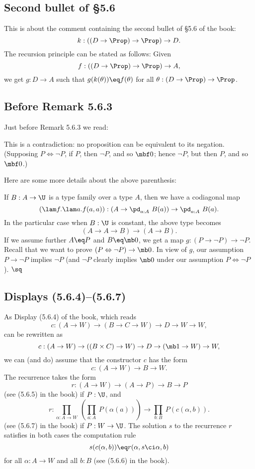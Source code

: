 \documentclass[12pt]{article}
\begin{document}

\subsection{Second bullet of \S5.6}%

This is about the comment containing the second bullet of \S5.6 of the book:
$$
k:((D\to\Prop)\to\Prop)\to D.
$$ 
The recursion principle can be stated as follows: Given 
$$
f:((D\to\Prop)\to\Prop)\to A,
$$ 
we get $g:D\to A$ such that $g(k(\theta))\eq f(\theta)$ for all $\theta:(D\to\Prop)\to\Prop$.


\subsection{Before Remark 5.6.3}%

Just before Remark 5.6.3 we read:

\nn\guillemotleft This is a contradiction: no proposition can be equivalent to its negation. (Supposing $P\Leftrightarrow\neg P$, if $P$, then $\neg P$, and so $\mbf0$; hence $\neg P$, but then $P$, and so $\mbf0$.)\guillemotright

Here are some more details about the above parenthesis:

If $B:A\to\U$ is a type family over a type $A$, then we have a codiagonal map 
\begin{equation}\label{563}
(\lam f.\lam a.f(a,a)):\left(A\to\pd_{a:A}\ B(a)\right)\to\pd_{a:A}\ B(a).
\end{equation} 
In the particular case when $B:\U$ is constant, the above type becomes 
$$
(A\to A\to B)\to(A\to B).
$$ 
If we assume further $A\eq P$ and $B\eq\mb0$, we get a map $g:(P\to\neg P)\to\neg P$. Recall that we want to prove $(P\Leftrightarrow\neg P)\to\mb0$. In view of $g$, our assumption $P\to\neg P$ implies $\neg P$ (and $\neg P$ clearly implies $\mb0$ under our assumption $P\Leftrightarrow\neg P$). $\sq$


\subsection{Displays (5.6.4)--(5.6.7)}%

As Display (5.6.4) of the book, which reads 
$$
c:(A\to W)\to(B\to C\to W)\to D\to W\to W,
$$ 
can be rewritten as 
$$
c:(A\to W)\to((B\times C)\to W)\to D\to(\mb1\to W)\to W,
$$ 
we can (and do) assume that the constructor $c$ has the form 
$$
c:(A\to W)\to B\to W.
$$ 
The recurrence takes the form 
$$
r:(A\to W)\to(A\to P)\to B\to P
$$ 
(see (5.6.5) in the book) if $P:\U$, and 
$$
r:\prod_{\alpha:A\to W}\ \left(\prod_{a:A}\ P(\alpha(a))\right)\to\prod_{b:B}\ P(c(\alpha,b)).
$$ 
(see (5.6.7) in the book) if $P:W\to\U$. The solution $s$ to the recurrence $r$ satisfies in both cases the computation rule
$$
s(c(\alpha,b))\eq r(\alpha,s\ci\alpha,b)
$$ 
for all $\alpha:A\to W$ and all $b:B$ (see (5.6.6) in the book).
\end{document}
